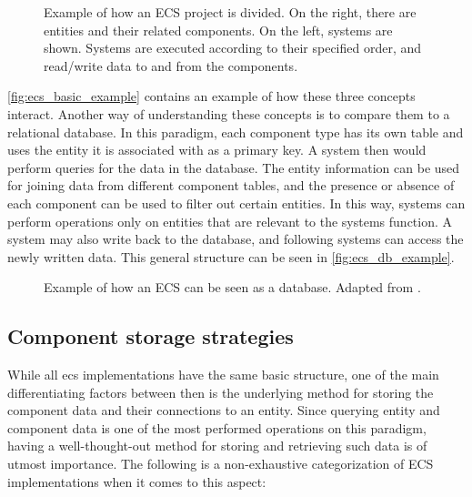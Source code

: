 \documentclass[twoside, 11pt]{article}
\begin{document}
\begin{figure}[h]
  \centering
  
  \caption[Example of how an ECS project is divided]{Example of how an ECS project is divided. On the right, there are entities and their related components. On the left, systems are shown. Systems are executed according to their specified order, and read/write data to and from the components.}
  \label{fig:ecs_basic_example}
\end{figure}

\autoref{fig:ecs_basic_example} contains an example of how these three concepts interact.  Another way of understanding these concepts is to compare them to a relational database. In this paradigm, each component type has its own table and uses the entity it is associated with as a primary key. A system then would perform queries for the data in the database. The entity information can be used for joining data from different component tables, and the presence or absence of each component can be used to filter out certain entities. In this way, systems can perform operations only on entities that are relevant to the systems function. A system may also write back to the database, and following systems can access the newly written data. This general structure can be seen in \autoref{fig:ecs_db_example}.

\begin{figure}
  \centering
  
  \caption[Example of how an ECS can be seen as a database]{Example of how an ECS can be seen as a database. Adapted from \cite{csherratt}.}
  \label{fig:ecs_db_example}
\end{figure}

\subsection{Component storage strategies}

While all \gls{ecs} implementations have the same basic structure, one of the main differentiating factors between then is the underlying method for storing the component data and their connections to an entity. Since querying entity and component data is one of the most performed operations on this paradigm, having a well-thought-out method for storing and retrieving such data is of utmost importance. The following is a non-exhaustive categorization of ECS implementations when it comes to this aspect:
\end{document}
